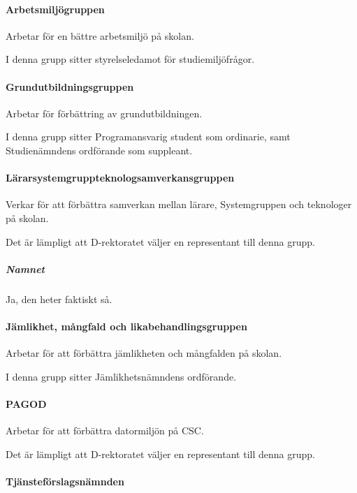 \documentclass[a4paper,12pt]{article}
\begin{document}
\paragraph{Arbetsmiljögruppen}

Arbetar för en bättre arbetsmiljö på skolan.

I denna grupp sitter styrelseledamot för studiemiljöfrågor.

\paragraph{Grundutbildningsgruppen}

Arbetar för förbättring av grundutbildningen.

I denna grupp sitter Programansvarig student som ordinarie, samt Studienämndens ordförande som suppleant.

\paragraph{Lärarsystemgruppteknologsamverkansgruppen}

Verkar för att förbättra samverkan mellan lärare, Systemgruppen och teknologer på skolan.

Det är lämpligt att D-rektoratet väljer en representant till denna grupp.

\subparagraph{Namnet}

Ja, den heter faktiskt så.

\paragraph{Jämlikhet, mångfald och likabehandlingsgruppen}

Arbetar för att förbättra jämlikheten och mångfalden på skolan.

I denna grupp sitter Jämlikhetsnämndens ordförande.

\paragraph{PAGOD}

Arbetar för att förbättra datormiljön på CSC.

Det är lämpligt att D-rektoratet väljer en representant till denna grupp.

\paragraph{Tjänsteförslagsnämnden}
\end{document}
